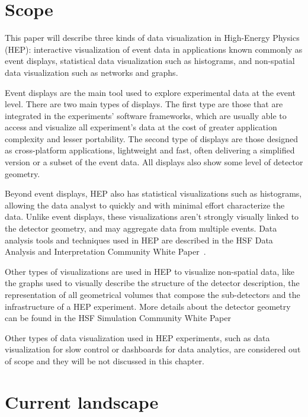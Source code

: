 \documentclass[12pt,a4paper]{article}
\begin{document}
\hypertarget{scope}{%
\section{Scope}\label{scope}}

This paper will describe three kinds of data visualization in High-Energy Physics (HEP): interactive visualization
of event data in applications known commonly as event displays, statistical data visualization such as
histograms, and non-spatial data visualization such as networks and graphs.

Event displays are the main tool used to explore experimental data at the event level.
There are two main types of displays. The first type are those that are integrated in the experiments’ software frameworks,
which are usually able to access and visualize all experiment’s data at the cost of greater application complexity and lesser portability.
The second type of displays are those designed as cross-platform applications, lightweight and fast, often
delivering a simplified version or a subset of the event data. All displays also show some level of detector geometry.

Beyond event displays, HEP also has statistical visualizations such as histograms, allowing the data analyst to quickly
and with minimal effort characterize the data.
Unlike event displays, these visualizations aren’t strongly visually linked to the detector geometry,
and may aggregate data from multiple events. Data analysis tools and techniques used in HEP are
described in the HSF Data Analysis and Interpretation Community White Paper~\cite{DataAnalysisCWP2017}.

Other types of visualizations are used in HEP to
visualize non-spatial data, like the graphs used to visually describe the structure of the detector description,
the representation of all geometrical volumes that compose the sub-detectors and the infrastructure of a HEP experiment.
More details about the detector geometry can be found in the HSF Simulation Community White Paper~\cite{hsf-cwp-simulation}

Other types of data visualization used in HEP experiments, such as data visualization for slow control
or dashboards for data analytics, are considered out of scope and they will be not discussed in this chapter.

\hypertarget{current-landscape}{%
\section{Current landscape}\label{current-landscape}}
\end{document}
